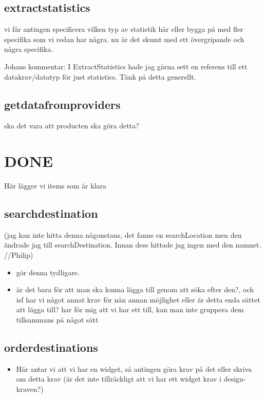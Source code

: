 \documentclass[a4paper]{article}
\begin{document}
	\subsection{extractstatistics}
vi får antingen specificera vilken typ av statistik  här eller bygga på med  fler specifika som vi redan har några. nu är det skumt med ett övergripande och några specifika.
	
	Johans kommentar: I ExtractStatistics hade jag gärna sett en referens till ett datakrav/datatyp för just statistics. Tänk på detta generellt.


	\subsection{getdatafromproviders}
	ska det vara att producten ska göra detta?
	



	
\section{DONE}
Här lägger vi items som är klara

	\subsection{searchdestination} (jag kan inte hitta denna någonstans, det fanns en searchLocation men den ändrade jag till searchDestination. Innan dess hittade jag ingen med den namnet. //Philip)
		\begin{itemize}
			\item gör denna tydligare. 
			\item är det bara för att man ska kunna lägga till genom att söka efter den?, och isf har vi något annat krav för nån annan möjlighet eller är detta enda sättet att lägga till? har för mig att vi har ett till, kan man inte gruppera dem tillsammans på något sätt
		\end{itemize}

\subsection{orderdestinations}
		\begin{itemize}
			\item Här antar vi att vi har en widget, så antingen göra krav på det eller skriva om detta krav (är det inte tillräckligt att vi har ett widget krav i design-kraven?)
		\end{itemize}
\end{document}
